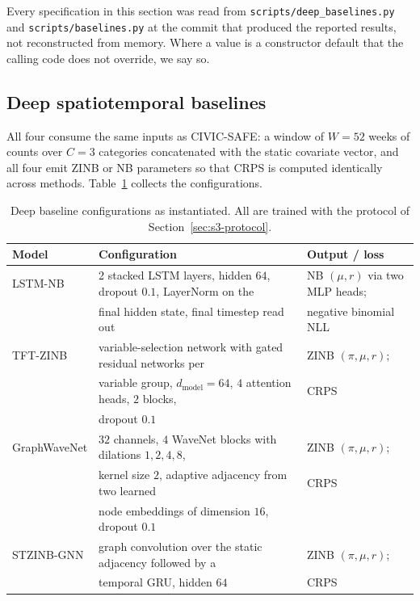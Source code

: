 \documentclass[journal,10pt,onecolumn]{IEEEtran}
\begin{document}
Every specification in this section was read from
\texttt{scripts/deep\_baselines.py} and \texttt{scripts/baselines.py} at the
commit that produced the reported results, not reconstructed from memory. Where a
value is a constructor default that the calling code does not override, we say so.

\subsection{Deep spatiotemporal baselines}

All four consume the same inputs as CIVIC-SAFE: a window of $W = 52$ weeks of
counts over $C = 3$ categories concatenated with the static covariate vector, and
all four emit ZINB or NB parameters so that CRPS is computed identically across
methods. Table~\ref{tab:s-baselines} collects the configurations.

\begin{table}[!t]
  \centering
  \caption{Deep baseline configurations as instantiated. All are trained with the
  protocol of Section~\ref{sec:s3-protocol}.}
  \label{tab:s-baselines}
  \small
  \begin{tabular}{l l l}
    \toprule
    \textbf{Model} & \textbf{Configuration} & \textbf{Output / loss} \\
    \midrule
    LSTM-NB & 2 stacked LSTM layers, hidden $64$,
              dropout $0.1$, LayerNorm on the & NB $(\mu, r)$ via two
              MLP heads; \\
            & final hidden state, final timestep read out
              & negative binomial NLL \\
    \addlinespace
    TFT-ZINB & variable-selection network with gated residual networks per
               & ZINB $(\pi,\mu,r)$; \\
             & variable group, $d_{\mathrm{model}} = 64$, $4$ attention heads,
               $2$ blocks, & CRPS \\
             & dropout $0.1$ & \\
    \addlinespace
    GraphWaveNet & $32$ channels, $4$ WaveNet blocks with dilations
                   $1,2,4,8$, & ZINB $(\pi,\mu,r)$; \\
                 & kernel size $2$, adaptive adjacency from two learned
                   & CRPS \\
                 & node embeddings of dimension $16$, dropout $0.1$ & \\
    \addlinespace
    STZINB-GNN & graph convolution over the static adjacency followed by a
                 & ZINB $(\pi,\mu,r)$; \\
               & temporal GRU, hidden $64$ & CRPS \\
    \bottomrule
  \end{tabular}
\end{table}
\end{document}
